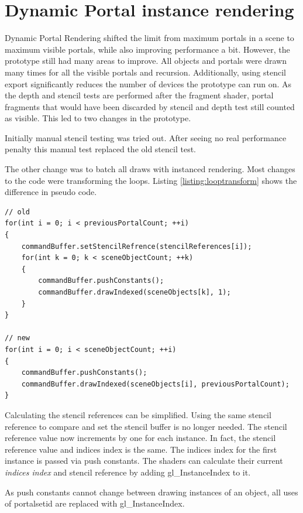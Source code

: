 \section{Dynamic Portal instance rendering}
\label{section:dynamicportalinstancerendering}
Dynamic Portal Rendering shifted the limit from maximum portals in a scene to maximum visible portals, while also improving performance a bit. However, the prototype still had many areas to improve. All objects and portals were drawn many times for all the visible portals and recursion. Additionally, using stencil export significantly reduces the number of devices the prototype can run on. As the depth and stencil tests are performed after the fragment shader, portal fragments that would have been discarded by stencil and depth test still counted as visible. This led to two changes in the prototype.

Initially manual stencil testing was tried out. After seeing no real performance penalty this manual test replaced the old stencil test.

The other change was to batch all draws with instanced rendering. Most changes to the code were transforming the loops. Listing \ref{listing:looptransform} shows the difference in pseudo code.

\begin{lstlisting}[caption={Pseudocode Loop Transformation}, label=listing:looptransform]
// old 
for(int i = 0; i < previousPortalCount; ++i)
{
	commandBuffer.setStencilRefrence(stencilReferences[i]);
	for(int k = 0; k < sceneObjectCount; ++k)
	{
		commandBuffer.pushConstants();
		commandBuffer.drawIndexed(sceneObjects[k], 1);
	}
}

// new
for(int i = 0; i < sceneObjectCount; ++i)
{
	commandBuffer.pushConstants();
	commandBuffer.drawIndexed(sceneObjects[i], previousPortalCount);
}
\end{lstlisting}


Calculating the stencil references can be simplified. Using the same stencil reference to compare and set the stencil buffer is no longer needed. The stencil reference value now increments by one for each instance. In fact, the stencil reference value and indices index is the same. The indices index for the first instance is passed via push constants. The shaders can calculate their current \textit{indices index} and stencil reference by adding gl\_InstanceIndex to it.

As push constants cannot change between drawing  instances of an object, all uses of \gls{portalsetid} are replaced with gl\_InstanceIndex.

